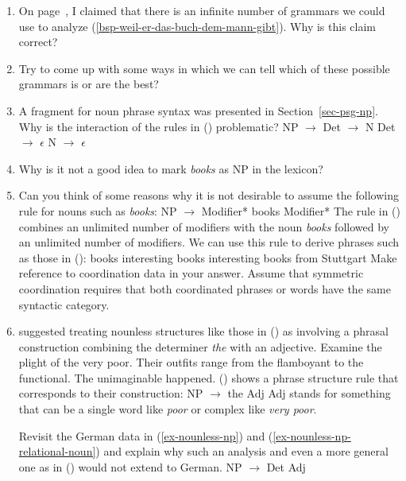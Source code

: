 \begin{enumerate}
\item\label{ua-psg-eins}
	On page~\pageref{page-unendlich-viele-grammatiken}, I claimed that there is an infinite number of
	grammars we could use to analyze (\ref{bsp-weil-er-das-buch-dem-mann-gibt}).
	Why is this claim correct?
\item Try to come up with some ways in which we can tell which of these possible grammars is or are the best?

\item\label{uebung-np-empty} A fragment for noun phrase syntax was presented in Section~\ref{sec-psg-np}.
Why is the interaction of the rules in () problematic?
\eal
\ex NP $\to$ Det \nbar
\ex \nbar $\to$ N
\ex Det $\to$ $\epsilon$
\ex N $\to$ $\epsilon$
\zl

\item Why is it not a good idea to mark \emph{books} as NP in the lexicon?

\item Can you think of some reasons why it is not desirable to assume the following rule for nouns such as \emph{books}:
\ea
NP $\to$ Modifier* books Modifier*
\z
The rule in () combines an unlimited number of modifiers with the noun \emph{books} followed by an unlimited number
of modifiers. We can use this rule to derive phrases such as those in ():
\eal
\ex books
\ex interesting books
\ex interesting books from Stuttgart
\zl
Make reference to coordination data in your answer. Assume that symmetric coordination requires that both
coordinated phrases or words have the same syntactic category.

\item \citet{FLGR2012a} suggested treating nounless structures like those in () as involving
  a phrasal construction combining the determiner \emph{the} with an adjective.
\eal
\ex Examine the plight of the very poor.
\ex Their outfits range from the flamboyant to the functional.
\ex The unimaginable happened.
\zl
() shows a phrase structure rule that corresponds to their construction:
\ea
NP $\to$ the Adj
\z
Adj stands for something that can be a single word like \emph{poor} or complex like \emph{very
  poor}.

Revisit the German data in (\ref{ex-nounless-np}) and (\ref{ex-nounless-np-relational-noun})  and
explain why such an analysis and even a more general one as in () would
not extend to German.
\ea
NP $\to$ Det Adj
\z


\end{enumerate}
